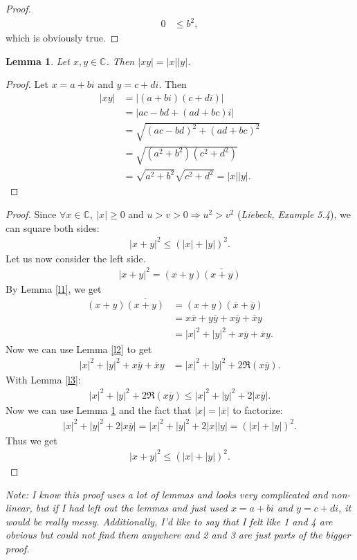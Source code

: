 \documentclass{article}
\newcommand*\lneg[1]{\overline{#1}}
\newcommand{\C}{\mathbb{C}}
\newtheorem{lemma}{Lemma}[section]
\begin{document}
\begin{adjustwidth}{2em}{0pt}
\begin{proof}
\begin{align*}
      0&\leq b^2,
    \end{align*}
    which is obviously true.
  \end{proof}
  \begin{lemma}
    \label{l4}
    Let $x,y\in\C$. Then $|xy|=|x||y|$.
  \end{lemma}
  \begin{proof}
    Let $x=a+bi$ and $y=c+di$. Then
    \begin{align*}
      |xy|&=|(a+bi)(c+di)|\\
      &=|ac-bd+(ad+bc)i|\\
      &=\sqrt{(ac-bd)^2+(ad+bc)^2}\\
      &=\sqrt{(a^2+b^2)(c^2+d^2)}\\
      &=\sqrt{a^2+b^2}\sqrt{c^2+d^2}=|x||y|.
    \end{align*} 
  \end{proof}
\end{adjustwidth}
\begin{proof}
  Since $\forall x\in\C,\:|x|\geq0$ and $u>v>0\Rightarrow u^2>v^2$ (\emph{Liebeck, Example 5.4}), we can square both sides:
  \begin{align*}
    |x+y|^2\leq (|x|+|y|)^2.
  \end{align*}
  Let us now consider the left side.
  \begin{align*}
    |x+y|^2=(x+y)\lneg{(x+y)}
  \end{align*}
  By Lemma \ref{l1}, we get
  \begin{align*}
    (x+y)\lneg{(x+y)}&=(x+y)(\lneg{x}+\lneg{y})\\
    &=x\lneg{x}+y\lneg{y}+x\lneg{y}+\lneg{x}y\\
    &=|x|^2+|y|^2+x\lneg{y}+\lneg{x}y.
  \end{align*}
  Now we can use Lemma \ref{l2} to get
  \begin{align*}
    |x|^2+|y|^2+x\lneg{y}+\lneg{x}y&=|x|^2+|y|^2+2\Re(x\lneg{y}).
  \end{align*}
  With Lemma \ref{l3}:
  \begin{align*}
    |x|^2+|y|^2+2\Re(x\lneg{y})\leq |x|^2+|y|^2+2|x\lneg{y}|.
  \end{align*}
  Now we can use Lemma \ref{l4} and the fact that $|x|=|\lneg{x}|$ to factorize:
  \begin{align*}
   |x|^2+|y|^2+2|x\lneg{y}| = |x|^2+|y|^2+2|x||y| = (|x|+|y|)^2.
  \end{align*}
  Thus we get
  \begin{align*}
    |x+y|^2\leq (|x|+|y|)^2.
  \end{align*}
\end{proof}
\emph{Note: I know this proof uses a lot of lemmas and looks very complicated and non-linear, but if I had left out the lemmas and just used $x=a+bi$ and $y=c+di$, it would be really messy. Additionally, I'd like to say that I felt like 1 and 4 are obvious but could not find them anywhere and 2 and 3 are just parts of the bigger proof.}
\end{document}

